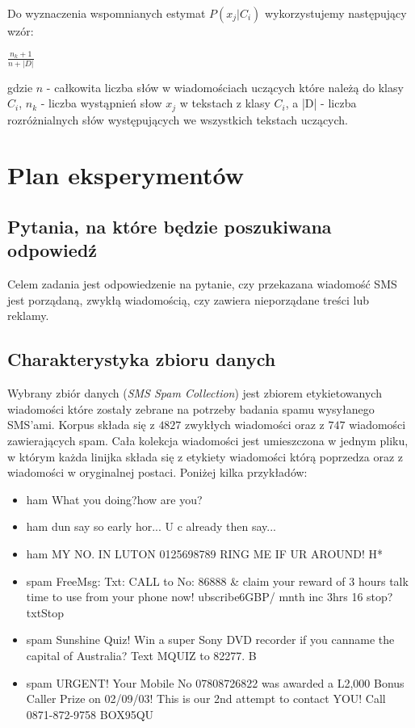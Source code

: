 \documentclass[a4paper,12pt]{article}
\begin{document}
Do wyznaczenia wspomnianych estymat $P(x_j|C_i)$ wykorzystujemy następujący wzór:

\begin{center}
$\frac{n_k + 1}{n + |D|}$
\end{center}

gdzie $n$ - całkowita liczba słów w wiadomościach uczących które należą do klasy $C_i$, $n_k$ - liczba wystąpnień słow $x_j$ w tekstach z klasy $C_i$, a |D| - liczba rozróżnialnych słów występujących we wszystkich tekstach uczących.

\section{Plan eksperymentów}

\subsection{Pytania, na które będzie poszukiwana odpowiedź}

Celem zadania jest odpowiedzenie na pytanie, czy przekazana wiadomość SMS jest porządaną, zwykłą wiadomością, czy zawiera nieporządane treści lub reklamy.

\subsection{Charakterystyka zbioru danych}

Wybrany zbiór danych (\textit{SMS Spam Collection}) jest zbiorem etykietowanych wiadomości które zostały zebrane na potrzeby badania spamu wysyłanego SMS'ami. Korpus składa się z $4827$ zwykłych wiadomości oraz z $747$ wiadomości zawierających spam. Cała kolekcja wiadomości jest umieszczona w jednym pliku, w którym każda linijka składa się z etykiety wiadomości którą poprzedza oraz z wiadomości w oryginalnej postaci. Poniżej kilka przykładów:

\begin{itemize}
\item ham What you doing?how are you? 
\item ham dun say so early hor... U c already then say... 
\item ham MY NO. IN LUTON 0125698789 RING ME IF UR AROUND! H* 
\item spam FreeMsg: Txt: CALL to No: 86888 \& claim your reward of 3 hours talk time to use from your phone now! ubscribe6GBP/ mnth inc 3hrs 16 stop?txtStop 
\item spam Sunshine Quiz! Win a super Sony DVD recorder if you canname the capital of Australia? Text MQUIZ to 82277. B 
\item spam URGENT! Your Mobile No 07808726822 was awarded a L2,000 Bonus Caller Prize on 02/09/03! This is our 2nd attempt to contact YOU! Call 0871-872-9758 BOX95QU 
\end{itemize}
\end{document}
